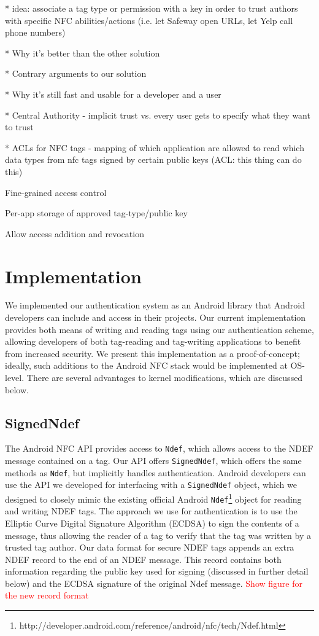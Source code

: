 \documentclass[12pt]{article}
\newcommand\TODO[1]{\textcolor{red}{#1}}
\begin{document}
* idea: associate a tag type or permission with a key in order to trust authors with specific NFC abilities/actions (i.e. let Safeway open URLs, let Yelp call phone numbers)

* Why it's better than the other solution

* Contrary arguments to our solution

* Why it's still fast and usable for a developer and a user

* Central Authority - implicit trust vs. every user gets to specify what they want to trust
 
* ACLs for NFC tags - mapping of which application are allowed to read which data types from nfc tags signed by certain public keys (ACL: this thing can do this)

Fine-grained access control

Per-app storage of approved tag-type/public key

Allow access addition and revocation



\section{Implementation}
We implemented our authentication system as an Android library that Android developers can include and access in their projects.
Our current implementation provides both means of writing and reading tags using our authentication scheme, allowing developers of both tag-reading and tag-writing applications to benefit from increased security.
We present this implementation as a proof-of-concept; ideally, such additions to the Android NFC stack would be implemented at OS-level.
There are several advantages to kernel modifications, which are discussed below.

\subsection{SignedNdef}
The Android NFC API provides access to \texttt{Ndef}, which allows access to the NDEF message contained on a tag.
Our API offers \texttt{SignedNdef}, which offers the same methods as \texttt{Ndef}, but implicitly handles authentication.
Android developers can use the API we developed for interfacing with a \texttt{SignedNdef} object, which we designed to closely mimic the existing official Android \texttt{Ndef}\footnote{http://developer.android.com/reference/android/nfc/tech/Ndef.html} object for reading and writing NDEF tags.
The approach we use for authentication is to use the Elliptic Curve Digital Signature Algorithm (ECDSA) to sign the contents of a message, thus allowing the reader of a tag to verify that the tag was written by a trusted tag author.
Our data format for secure NDEF tags appends an extra NDEF record to the end of an NDEF message.
This record contains both information regarding the public key used for signing (discussed in further detail below) and the ECDSA signature of the original Ndef message.
\TODO{Show figure for the new record format}
\end{document}
